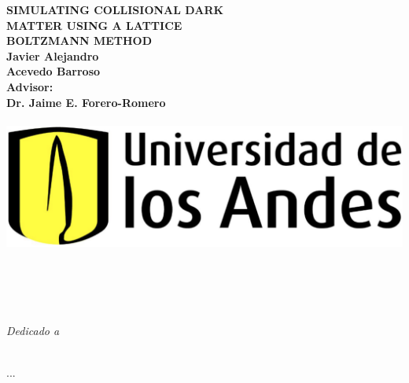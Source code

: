 
\begin{titlepage}
   \begin{center}
      \Large\textbf{SIMULATING COLLISIONAL DARK}\\
      \vspace{-4mm}\Large\textbf{MATTER USING A LATTICE}\\
      \vspace{-4mm}\Large\textbf{BOLTZMANN METHOD}\\
\vspace{15mm}
      \Large\textbf{Javier Alejandro}\\
      \vspace{-5mm}\Large\textbf{Acevedo Barroso}\\
\vspace{11mm}      
      \Large\textbf{Advisor:}\\
      \vspace{-5mm}\Large\textbf{Dr. Jaime E. Forero-Romero}\\
\vspace{15mm}      
     \Large{}\\
\vspace{8mm}           
      {\includegraphics[scale=0.11]{imag/logoUniandes.png}}\\
\vspace{3mm}           
      \Large{}\\
      \vspace{-4mm}\Large{}\\
      \vspace{-4mm}\Large{}\\
      \vspace{-4mm}\Large{}\\
      \vspace{-1mm}\Large{}
   \end{center}
\end{titlepage}

\thispagestyle{plain}
\begin{dedication}
\Huge\textit{Dedicado a}\\
\vspace{-1mm}\large{}\\
\end{dedication}
\begin{flushright}
...
\end{flushright}